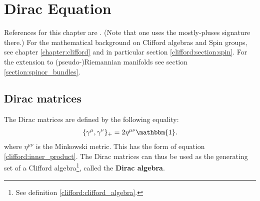 \chapter{Dirac Equation}\label{chapter:dirac}

    References for this chapter are \cite{supergravity}. (Note that one uses the mostly-pluses signature there.) For the mathematical background on Clifford algebras and Spin groups, see chapter \ref{chapter:clifford} and in particular section \ref{clifford:section:spin}. For the extension to (pseudo-)Riemannian manifolds see section \ref{section:spinor_bundles}.

\section{Dirac matrices}

    \begin{property}
        The Dirac matrices are defined by the following equality:
        \begin{gather}
            \label{dirac:clifford_relation}
            \{\gamma^\mu,\gamma^\nu\}_+ = 2\eta^{\mu\nu}\mathbbm{1}.
        \end{gather}
        where $\eta^{\mu\nu}$ is the Minkowski metric. This has the form of equation \ref{clifford:inner_product}. The Dirac matrices can thus be used as the generating set of a Clifford algebra\footnote{See definition \ref{clifford:clifford_algebra}.}, called the \textbf{Dirac algebra}.
    \end{property}

